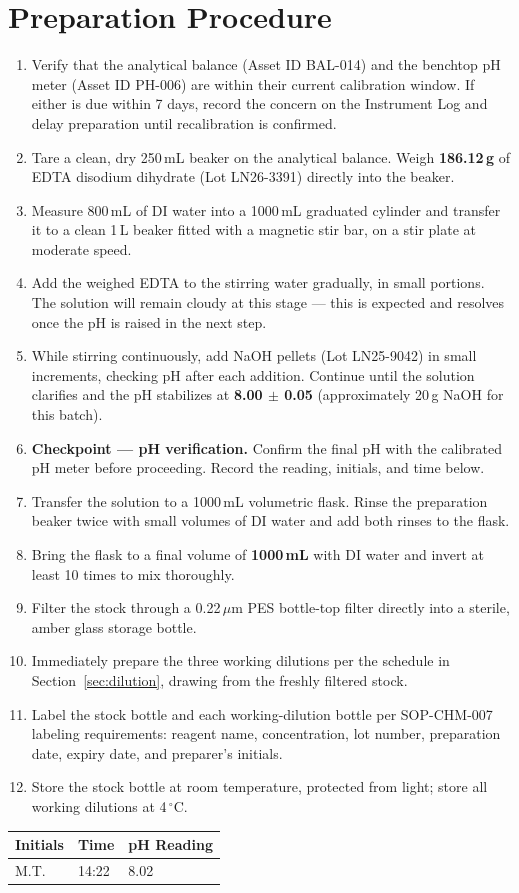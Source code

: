 \section{Preparation Procedure}
\label{sec:prep}

\begin{enumerate}[leftmargin=1.6em, itemsep=4pt, label=\textbf{\color{labteal}\arabic*.}]
  \item Verify that the analytical balance (Asset ID BAL-014) and the benchtop pH meter
        (Asset ID PH-006) are within their current calibration window. If either is due
        within 7 days, record the concern on the Instrument Log and delay preparation
        until recalibration is confirmed.
  \item Tare a clean, dry 250\,mL beaker on the analytical balance. Weigh
        \textbf{186.12\,g} of EDTA disodium dihydrate (Lot LN26-3391) directly into the
        beaker.
  \item Measure 800\,mL of DI water into a 1000\,mL graduated cylinder and transfer it to
        a clean 1\,L beaker fitted with a magnetic stir bar, on a stir plate at moderate
        speed.
  \item Add the weighed EDTA to the stirring water gradually, in small portions. The
        solution will remain cloudy at this stage --- this is expected and resolves once
        the pH is raised in the next step.
  \item While stirring continuously, add NaOH pellets (Lot LN25-9042) in small increments,
        checking pH after each addition. Continue until the solution clarifies and the pH
        stabilizes at \textbf{8.00 $\pm$ 0.05} (approximately 20\,g NaOH for this batch).
  \item \textbf{Checkpoint --- pH verification.} Confirm the final pH with the calibrated
        pH meter before proceeding. Record the reading, initials, and time below.
  \item Transfer the solution to a 1000\,mL volumetric flask. Rinse the preparation beaker
        twice with small volumes of DI water and add both rinses to the flask.
  \item Bring the flask to a final volume of \textbf{1000\,mL} with DI water and invert at
        least 10 times to mix thoroughly.
  \item Filter the stock through a 0.22\,$\mu$m PES bottle-top filter directly into a
        sterile, amber glass storage bottle.
  \item Immediately prepare the three working dilutions per the schedule in
        Section~\ref{sec:dilution}, drawing from the freshly filtered stock.
  \item Label the stock bottle and each working-dilution bottle per SOP-CHM-007 labeling
        requirements: reagent name, concentration, lot number, preparation date, expiry
        date, and preparer's initials.
  \item Store the stock bottle at room temperature, protected from light; store all
        working dilutions at 4\,$^\circ$C.
\end{enumerate}

\begin{center}
\begin{tabularx}{0.7\textwidth}{@{}XXX@{}}
\toprule
\textbf{Initials} & \textbf{Time} & \textbf{pH Reading} \\
\midrule
M.T. & 14:22 & 8.02 \\
\bottomrule
\end{tabularx}
\end{center}
